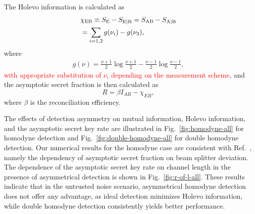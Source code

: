 \documentclass[%
reprint,
superscriptaddress,
 amsmath,amssymb,amsfonts,
 aps,
 pra,
 longbibliography
]{revtex4-2}
\newcommand{\ind}[1]{\mathrm{#1}}
\begin{document}
The Holevo information is calculated as
\begin{align}
\label{eq:chi}
    &\chi_{\ind{EB}}\equiv S_{\ind{E}}-S_{\ind{E}|\ind{B}}=S_{\ind{AB}}-S_{\ind{A}|\ind{B}}\notag\\&=\sum_{i=1,2}g(\nu_i)-g(\nu_3),
\end{align}
where
\begin{align}
\label{eq:g(nu)}
    g(\nu)=\frac{\nu+1}{2}\log \frac{\nu+1}{2}-
    \frac{\nu-1}{2}\log\frac{\nu-1}{2},
\end{align}
\textcolor{red}{with appropriate substitution of $\nu_i$ depending on the measurement scheme}, and the asymptotic secret fraction is then calculated as
\begin{equation}
\label{eq:r}
    R=\beta I_{AB}-\chi_{EB},
\end{equation}
where $\beta$ is the reconciliation efficiency.

The effects of detection asymmetry on mutual information, Holevo information, and the asymptotic secret key rate are illustrated in Fig.~\ref{fig:homodyne-all} for homodyne detection and Fig.~\ref{fig:double-homodyne-all} for double homodyne detection. Our numerical results for the homodyne case are consistent 
with Ref.~\cite{ruiz2023effects}, namely the dependency of asymptotic secret fraction on beam splitter deviation. The dependence of the asymptotic secret key rate on channel length in the presence of asymmetrical detection is shown in Fig.~\ref{fig:r-of-l-all}. These results indicate that in the untrusted noise scenario, asymmetrical homodyne detection does not offer any advantage, as ideal detection minimizes Holevo information, while double homodyne detection consistently yields better performance.
\end{document}
